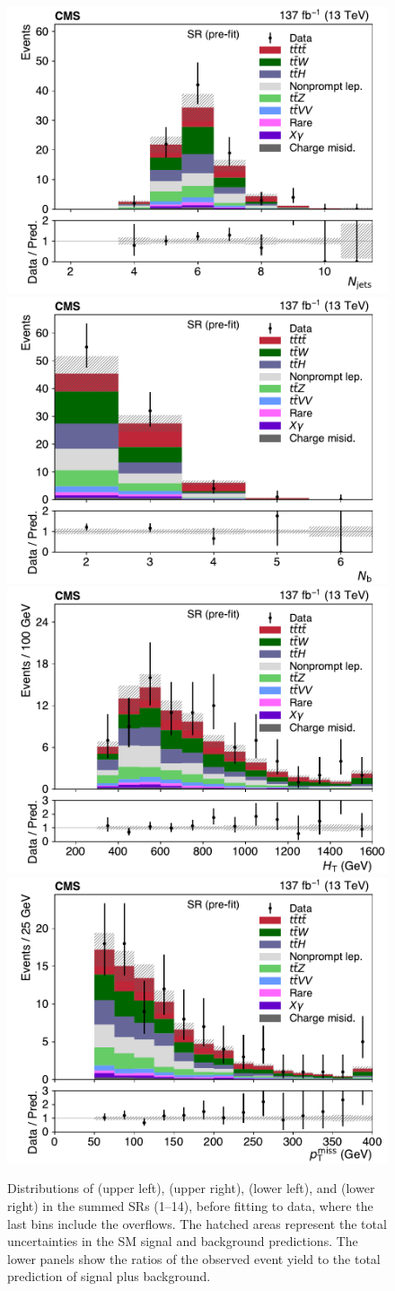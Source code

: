 \begin{figure}[!hbt]
\centering
\includegraphics[width=.49\textwidth]{figs/ftp/sr_njets_prefit.pdf}
\includegraphics[width=.49\textwidth]{figs/ftp/sr_nbtags_prefit.pdf}
\includegraphics[width=.49\textwidth]{figs/ftp/sr_ht_prefit.pdf}
\includegraphics[width=.49\textwidth]{figs/ftp/sr_met_prefit.pdf}
\caption{ Distributions of \Njets (upper left), \Nbjets (upper right), \HT (lower left), and \ptmiss (lower right) in the summed SRs (1--14), before fitting to data,
where the last bins include the overflows. The hatched areas represent the total uncertainties in the SM signal and background predictions.
 The lower panels show the ratios of the observed event yield to the total prediction of
    signal plus background.
    }
\label{fig:kinemsr}
\end{figure}

